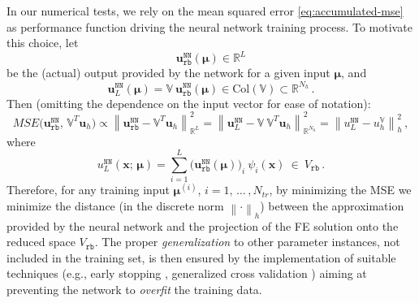 \documentclass[longtitle]{elsarticle}
\numberwithin{equation}{section}
\theoremstyle{theorem}
\theoremstyle{definition}
\theoremstyle{remark}
\theoremstyle{proposition}
\numberwithin{figure}{section}
\newcommand{\norm}[1]{\left\lVert#1\right\rVert}
\newcommand{\bg}[1]{\boldsymbol{#1}}
\begin{document}
		In our numerical tests, we rely on the mean squared error \eqref{eq:accumulated-mse} as performance function driving the neural network training process. To motivate this choice, let 
		\begin{equation*}
			\mathbf{u}_{\texttt{rb}}^{\texttt{NN}}(\bg{\mu}) \in \mathbb{R}^L
		\end{equation*}
		be the (actual) output provided by the network for a given input $\bg{\mu}$, and 
		\begin{equation*}
			\mathbf{u}_L^{\texttt{NN}}(\bg{\mu}) = \mathbb{V} ~ \mathbf{u}_{\texttt{rb}}^{\texttt{NN}}(\bg{\mu}) \in \text{Col}(\mathbb{V}) \subset \mathbb{R}^{N_h} \, . 
		\end{equation*}
		Then (omitting the dependence on the input vector for ease of notation):
		\begin{equation*}
			MSE \big( \mathbf{u}_{\texttt{rb}}^{\texttt{NN}}, \, \mathbb{V}^T \mathbf{u}_h \big) \propto \norm{\mathbf{u}_{\texttt{rb}}^{\texttt{NN}} - \mathbb{V}^T \mathbf{u}_h}^2_{\mathbb{R}^L} = \norm{\mathbf{u}_L^{\texttt{NN}} - \mathbb{V} ~ \mathbb{V}^T \mathbf{u}_h}^2_{\mathbb{R}^{N_h}} = \norm{u_L^{\texttt{NN}} - u_h^{\mathbb{V}}}^2_h \, ,
		\end{equation*}
		where
		\begin{equation*}
			u_L^{\texttt{NN}}(\bg{x}; \, \bg{\mu}) = \sum_{i = 1}^L \big( \mathbf{u}_{\texttt{rb}}^{\texttt{NN}}(\bg{\mu}) \big)_i ~ \psi_i(\bg{x}) ~ \in ~ V_{\texttt{rb}} \, .
		\end{equation*}
		Therefore, for any training input $\bg{\mu}^{(i)}$, $i = 1, \, \ldots \, , N_{tr}$, by minimizing the MSE we minimize the distance (in the discrete norm $\norm{\cdot}_h$) between the approximation provided by the neural network and the projection of the FE solution onto the reduced space $V_{\texttt{rb}}$. The proper \emph{generalization} to other parameter instances, not included in the training set, is then ensured by the implementation of suitable techniques (e.g., early stopping \cite{Mat16}, generalized cross validation \cite{Koh95}) aiming at preventing the network to \emph{overfit} the training data.
		
\end{document}
